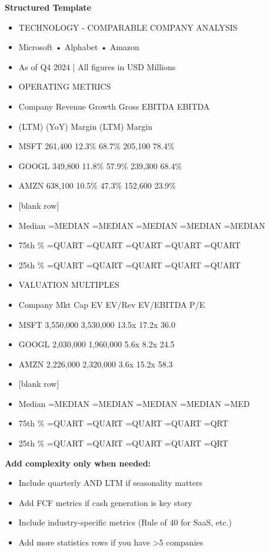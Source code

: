\documentclass[11pt]{article}
\begin{document}
\textbf{Structured Template}
\begin{itemize}[leftmargin=*,itemsep=2pt,topsep=2pt]
\item {} TECHNOLOGY - COMPARABLE COMPANY ANALYSIS
\item {} Microsoft • Alphabet • Amazon
\item {} As of Q4 2024 | All figures in USD Millions
\item {} OPERATING METRICS
\item {} Company Revenue Growth Gross EBITDA EBITDA
\item {} (LTM) (YoY) Margin (LTM) Margin
\item {} MSFT 261,400 12.3\% 68.7\% 205,100 78.4\%
\item {} GOOGL 349,800 11.8\% 57.9\% 239,300 68.4\%
\item {} AMZN 638,100 10.5\% 47.3\% 152,600 23.9\%
\item {} [blank row]
\item {} Median =MEDIAN =MEDIAN =MEDIAN =MEDIAN =MEDIAN
\item {} 75th \% =QUART =QUART =QUART =QUART =QUART
\item {} 25th \% =QUART =QUART =QUART =QUART =QUART
\item {} VALUATION MULTIPLES
\item {} Company Mkt Cap EV EV/Rev EV/EBITDA P/E
\item {} MSFT 3,550,000 3,530,000 13.5x 17.2x 36.0
\item {} GOOGL 2,030,000 1,960,000 5.6x 8.2x 24.5
\item {} AMZN 2,226,000 2,320,000 3.6x 15.2x 58.3
\item {} [blank row]
\item {} Median =MEDIAN =MEDIAN =MEDIAN =MEDIAN =MED
\item {} 75th \% =QUART =QUART =QUART =QUART =QRT
\item {} 25th \% =QUART =QUART =QUART =QUART =QRT
\end{itemize}

\textbf{Add complexity only when needed:}

\begin{itemize}[leftmargin=*,itemsep=2pt,topsep=2pt]
\item {} Include quarterly AND LTM if seasonality matters
\item {} Add FCF metrics if cash generation is key story
\item {} Include industry-specific metrics (Rule of 40 for SaaS, etc.)
\item {} Add more statistics rows if you have >5 companies
\end{itemize}
\end{document}
